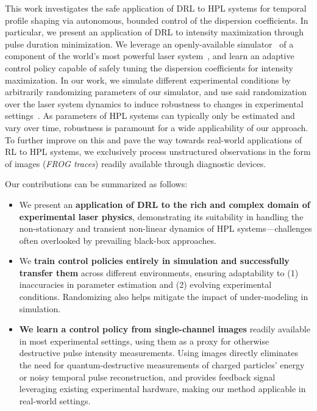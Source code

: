 This work investigates the safe application of DRL to HPL systems for temporal profile shaping via autonomous, bounded control of the dispersion coefficients. 
In particular, we present an application of DRL to intensity maximization through pulse duration minimization. 
We leverage an openly-available simulator~\citep{capuano2023temporl} of a component of the world's most powerful laser system~\citep{batysta2014pulse}, and learn an adaptive control policy capable of safely tuning the dispersion coefficients for intensity maximization. 
In our work, we simulate different experimental conditions by arbitrarily randomizing parameters of our simulator, and use said randomization over the laser system dynamics to induce robustness to changes in experimental settings~\citep{tiboni2023domain}.
As parameters of HPL systems can typically only be estimated and vary over time, robustness is paramount for a wide applicability of our approach. To further improve on this and pave the way towards real-world applications of RL to HPL systems, we exclusively process unstructured observations in the form of images (\textit{FROG traces}) readily available through diagnostic devices. 

Our contributions can be summarized as follows:
\begin{itemize}
    \item We present an \textbf{application of DRL to the rich and complex domain of experimental laser physics}, demonstrating its suitability in handling the non-stationary and transient non-linear dynamics of HPL systems---challenges often overlooked by prevailing black-box approaches.
    \item We \textbf{train control policies entirely in simulation and successfully transfer them} across different environments, ensuring adaptability to (1) inaccuracies in parameter estimation and (2) evolving experimental conditions. Randomizing also helps mitigate the impact of under-modeling in simulation.
    \item \textbf{We learn a control policy from single-channel images} readily available in most experimental settings, using them as a proxy for otherwise destructive pulse intensity measurements. Using images directly eliminates the need for quantum-destructive measurements of charged particles' energy or noisy temporal pulse reconstruction, and provides feedback signal leveraging existing experimental hardware, making our method applicable in real-world settings.
\end{itemize}
